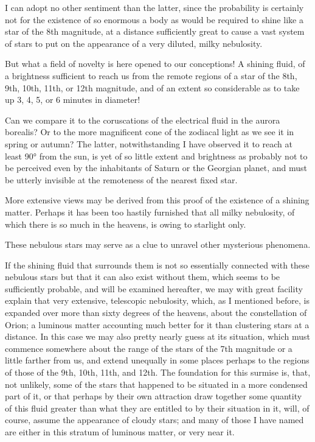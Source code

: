 \documentclass[a4paper, 12pt, oneside, polutonikogreek, english]{article}
\begin{document}
I can adopt no other sentiment than the latter, since the probability is certainly not for the existence of so enormous a body as would be required to shine like a star of the 8th magnitude, at a distance sufficiently great to cause a vast system of stars to put on the appearance of a very diluted, milky nebulosity.

But what a field of novelty is here opened to our conceptions! A shining fluid, of a brightness sufficient to reach us from the remote regions of a star of the 8th, 9th, 10th, 11th, or 12th magnitude, and of an extent so considerable as to take up 3, 4, 5, or 6 minutes in diameter!

Can we compare it to the coruscations of the electrical fluid in the aurora borealis? Or to the more magnificent cone of the zodiacal light as we see it in spring or autumn? The latter, notwithstanding I have observed it to reach at least 90° from the sun, is yet of so little extent and brightness as probably not to be perceived even by the inhabitants of Saturn or the Georgian planet, and must be utterly invisible at the remoteness of the nearest fixed star.

More extensive views may be derived from this proof of the existence of a shining matter. Perhaps it has been too hastily furnished that all milky nebulosity, of which there is so much in the heavens, is owing to starlight only.

These nebulous stars may serve as a clue to unravel other mysterious phenomena.

If the shining fluid that surrounds them is not so essentially connected with these nebulous stars but that it can also exist without them, which seems to be sufficiently probable, and will be examined hereafter, we may with great facility explain that very extensive, telescopic nebulosity, which, as I mentioned before, is expanded over more than sixty degrees of the heavens, about the constellation of Orion; a luminous matter accounting much better for it than clustering stars at a distance. In this case we may also pretty nearly guess at its situation, which must commence somewhere about the range of the stars of the 7th magnitude or a little farther from us, and extend unequally in some places perhaps to the regions of those of the 9th, 10th, 11th, and 12th. The foundation for this surmise is, that, not unlikely, some of the stars that happened to be situated in a more condensed part of it, or that perhaps by their own attraction draw together some quantity of this fluid greater than what they are entitled to by their situation in it, will, of course, assume the appearance of cloudy stars; and many of those I have named are either in this stratum of luminous matter, or very near it.
\end{document}
